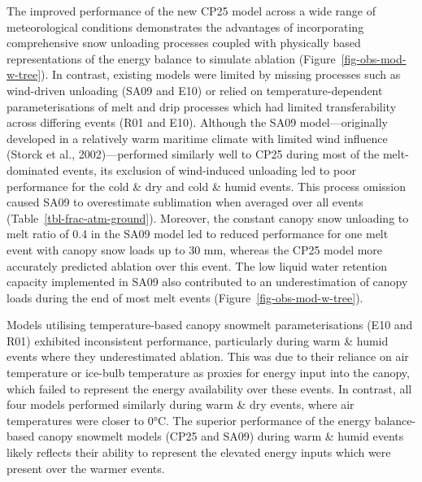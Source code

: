 \documentclass[
]{agujournal2019}
\begin{document}
The improved performance of the new CP25 model across a wide range of
meteorological conditions demonstrates the advantages of incorporating
comprehensive snow unloading processes coupled with physically based
representations of the energy balance to simulate ablation
(Figure~\ref{fig-obs-mod-w-tree}). In contrast, existing models were
limited by missing processes such as wind-driven unloading (SA09 and
E10) or relied on temperature-dependent parameterisations of melt and
drip processes which had limited transferability across differing events
(R01 and E10). Although the SA09 model---originally developed in a
relatively warm maritime climate with limited wind influence (Storck et
al., 2002)---performed similarly well to CP25 during most of the
melt-dominated events, its exclusion of wind-induced unloading led to
poor performance for the cold \& dry and cold \& humid events. This
process omission caused SA09 to overestimate sublimation when averaged
over all events (Table~\ref{tbl-frac-atm-ground}). Moreover, the
constant canopy snow unloading to melt ratio of 0.4 in the SA09 model
led to reduced performance for one melt event with canopy snow loads up
to 30 mm, whereas the CP25 model more accurately predicted ablation over
this event. The low liquid water retention capacity implemented in SA09
also contributed to an underestimation of canopy loads during the end of
most melt events (Figure~\ref{fig-obs-mod-w-tree}).

Models utilising temperature-based canopy snowmelt parameterisations
(E10 and R01) exhibited inconsistent performance, particularly during
warm \& humid events where they underestimated ablation. This was due to
their reliance on air temperature or ice-bulb temperature as proxies for
energy input into the canopy, which failed to represent the energy
availability over these events. In contrast, all four models performed
similarly during warm \& dry events, where air temperatures were closer
to 0°C. The superior performance of the energy balance-based canopy
snowmelt models (CP25 and SA09) during warm \& humid events likely
reflects their ability to represent the elevated energy inputs which
were present over the warmer events.
\end{document}
